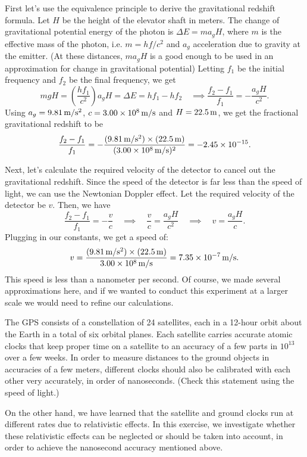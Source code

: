 \documentclass{../../templates/lkx_pset}
\begin{document}
\begin{solution}
  First let's use the equivalence principle to derive the gravitational redshift formula. Let $H$ be the height of the elevator shaft in meters. The change of gravitational potential energy of the photon is $\Delta E = m a_gH$, where $m$ is the effective mass of the photon, i.e. $m=hf/c^2$ and $a_g$ acceleration due to gravity at the emitter. (At these distances, $ma_g H$ is a good enough to be used in an approximation for change in gravitational potential) Letting $f_1$ be the initial frequency and $f_2$ be the final frequency, we get
  \[
    mgH = \left(\frac{hf_1}{c^2}\right)a_g H = \Delta E = hf_1 - hf_2 \quad\implies \frac{f_2 - f_1}{f_1} = -\frac{a_g H}{c^2}.
  \]
	Using $a_g = \mpsssi{9.81}$, $c=\mpssi{3.00e8}$ and $H=\msi{22.5}$, we get the fractional gravitational redshift to be
  \[
    \frac{f_2 - f_1}{f_1} = -\frac{(\mpsssi{9.81})\times (\msi{22.5})}{(\mpssi{3.00e8})^2}= -2.45\times 10^{-15}.
  \]

  Next, let's calculate the required velocity of the detector to cancel out the gravitational redshift. Since the speed of the detector is far less than the speed of light, we can use the Newtonian Doppler effect. Let the required velocity of the detector be $v$. Then, we have
  \[
    \frac{f_2 - f_1}{f_1} = -\frac{v}{c}\quad\implies\quad \frac{v}{c}=\frac{a_g H}{c^2}\quad\implies\quad v = \frac{a_g H}{c}.
  \]
  Plugging in our constants, we get a speed of:
  \[
    v = \frac{(\mpsssi{9.81})\times (\msi{22.5})}{\mpssi{3.00e8}}= \mpssi{7.35e-7}.
  \]
  This speed is less than a nanometer per second. Of course, we made several approximations here, and if we wanted to conduct this experiment at a larger scale we would need to refine our calculations.
\end{solution}

\begin{problem}{4}
The GPS consists of a constellation of 24 satellites, each in a 12-hour orbit about the Earth in a total of six orbital planes. Each satellite carries accurate atomic clocks that keep proper time on a satellite to an accuracy of a few parts in $10^13$ over a few weeks. In order to measure distances to the ground objects in accuracies of a few meters, different clocks should also be calibrated with each other very accurately, in order of nanoseconds. (Check this statement using the speed of light.)

\quad On the other hand, we have learned that the satellite and ground clocks run at different rates due to relativistic effects. In this exercise, we investigate whether these relativistic effects can be neglected or should be taken into account, in order to achieve the nanosecond accuracy mentioned above.
\end{problem}
\end{document}
